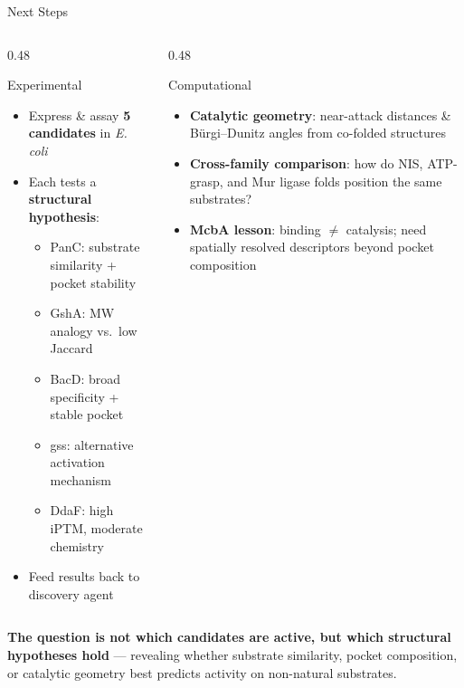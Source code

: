 \documentclass[aspectratio=169, 11pt]{beamer}
\begin{document}
\begin{frame}{Next Steps}
\vspace{-4pt}
\begin{columns}[T]
\begin{column}{0.48\textwidth}
\begin{block}{Experimental}
\begin{itemize}
\item Express \& assay \textbf{5 candidates} in \textit{E. coli}
\item Each tests a \textbf{structural hypothesis}:
  \begin{itemize}\small
  \item PanC: substrate similarity + pocket stability
  \item GshA: MW analogy vs.\ low Jaccard
  \item BacD: broad specificity + stable pocket
  \item gss: alternative activation mechanism
  \item DdaF: high iPTM, moderate chemistry
  \end{itemize}
\item Feed results back to discovery agent
\end{itemize}
\end{block}
\end{column}

\begin{column}{0.48\textwidth}
\begin{exampleblock}{Computational}
\begin{itemize}
\item \textbf{Catalytic geometry}: near-attack distances \& B\"urgi--Dunitz angles from co-folded structures
\item \textbf{Cross-family comparison}: how do NIS, ATP-grasp, and Mur ligase folds position the same substrates?
\item \textbf{McbA lesson}: binding $\neq$ catalysis; need spatially resolved descriptors beyond pocket composition
\end{itemize}
\end{exampleblock}
\end{column}
\end{columns}

\vspace{6pt}
\colorbox{accentgreen!15}{\parbox{0.88\textwidth}{\centering
\textbf{The question is not which candidates are active, but which structural hypotheses hold} --- revealing whether substrate similarity, pocket composition, or catalytic geometry best predicts activity on non-natural substrates.
}}
\end{frame}
\end{document}
